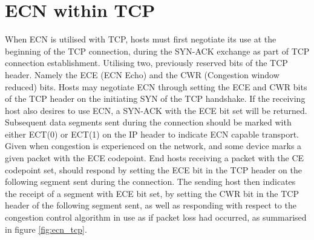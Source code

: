 \documentclass{l4proj}
\begin{document}
\section{ECN within TCP}

When ECN is utilised with TCP, hosts must first negotiate its use at the beginning of the TCP connection, during the SYN-ACK exchange as part of TCP connection establishment. Utilising two, previously reserved bits of the TCP header. Namely the ECE (ECN Echo) and the CWR (Congestion window reduced) bits. Hosts may negotiate ECN through setting the ECE and CWR bits of the TCP header on the initiating SYN of the TCP handshake. If the receiving host also desires to use ECN, a SYN-ACK with the ECE bit set will be returned. Subsequent data segments sent during the connection should be marked with either ECT(0) or ECT(1) on the IP header to indicate ECN capable transport. Given when congestion is experienced on the network, and some device marks a given packet with the ECE codepoint. End hosts receiving a packet with the CE codepoint set, should respond by setting the ECE bit in the TCP header on the following segment sent during the connection. The sending host then indicates the receipt of a segment with ECE bit set, by setting the CWR bit in the TCP header of the following segment sent, as well as responding with respect to the congestion control algorithm in use as if packet loss had occurred, as summarised in figure \ref{fig:ecn_tcp}.
\end{document}
